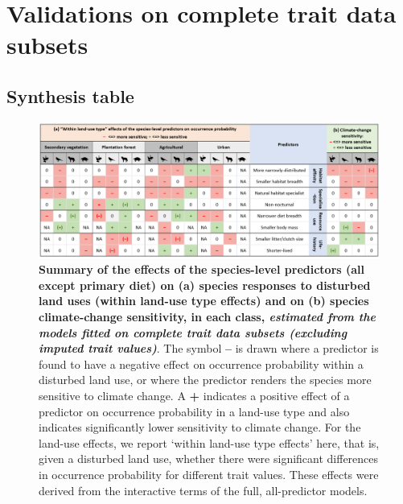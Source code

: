 \documentclass[11pt]{article}
\begin{document}
\section{Validations on complete trait data subsets}

\begin{landscape}
\subsection{Synthesis table}
\begin{figure}[h!]
\centering
\includegraphics[scale=0.7]{Figures/SynthesisTableValidation}
\caption[]{\textbf{Summary of the effects of the species-level predictors (all except primary diet) on (a) species responses to disturbed land uses (within land-use type effects) and on (b) species climate-change sensitivity, in each class, \textit{estimated from the models fitted on complete trait data subsets (excluding imputed trait values)}}. The symbol \textbf{–} is drawn where a predictor is found to have a negative effect on occurrence probability within a disturbed land use, or where the predictor renders the species more sensitive to climate change. A \textbf{+} indicates a positive effect of a predictor on occurrence probability in a land-use type and also indicates significantly lower sensitivity to climate change. For the land-use effects, we report  `within land-use type effects' here, that is, given a disturbed land use, whether there were significant differences in occurrence probability for different trait values. These effects were derived from the interactive terms of the full, all-predictor models. }
\label{}
\end{figure}
\end{landscape}
\end{document}
